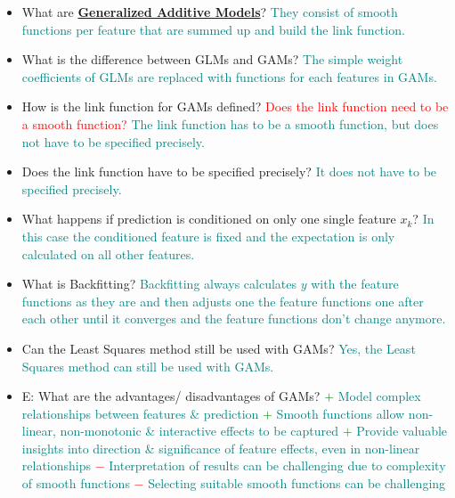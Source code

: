 \documentclass{report}
\newcommand{\asw}[2][teal]{}
\renewcommand{\asw}[2][teal]{\textcolor{#1}{#2}}
\newcommand{\qst}[2][red]{\textcolor{#1}{#2}}
\begin{document}
\begin{itemize}
	\item What are \textbf{\underline{Generalized Additive Models}}?
	\asw{\newline They consist of smooth functions per feature that are summed up and build the link function.}
	\item What is the difference between GLMs and GAMs?
	\asw{\newline The simple weight coefficients of GLMs are replaced with functions for each features in GAMs.}
	\item How is the link function for GAMs defined? \qst{Does the link function need to be a smooth function?}
	\asw{\newline The link function has to be a smooth function, but does not have to be specified precisely.}
	\item Does the link function have to be specified precisely?
	\asw{\newline It does not have to be specified precisely.}
	\item What happens if prediction is conditioned on only one single feature $x_k$?
	\asw{\newline In this case the conditioned feature is fixed and the expectation is only calculated on all other features.}
	\item What is Backfitting?
	\asw{\newline Backfitting always calculates $y$ with the feature functions as they are and then adjusts one the feature functions one after each other until it converges and the feature functions don't change anymore.}
	\item Can the Least Squares method still be used with GAMs?
	\asw{\newline Yes, the Least Squares method can still be used with GAMs.}
	\item E: What are the advantages/ disadvantages of GAMs?
	\asw{\newline \textcolor{green}{$+$} Model complex relationships between features \& prediction
		\newline \textcolor{green}{$+$} Smooth functions allow non-linear, non-monotonic \& interactive effects to be captured
		\newline \textcolor{green}{$+$} Provide valuable insights into direction \& significance of feature effects, even in non-linear relationships
		\newline \textcolor{red}{$-$} Interpretation of results can be challenging due to complexity of smooth functions
		\newline \textcolor{red}{$-$} Selecting suitable smooth functions can be challenging}
	
	\end{itemize}
	\newpage
\end{document}
